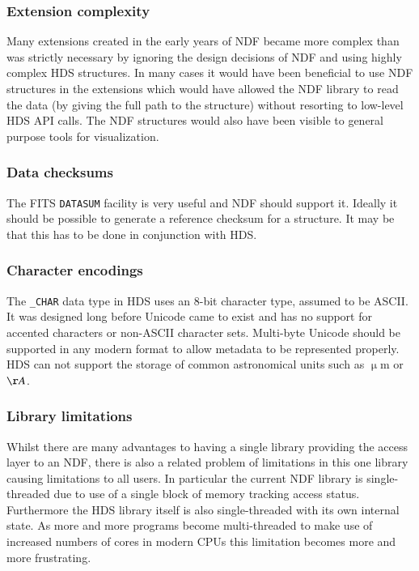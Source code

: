 \documentclass[final,authoryear,5p,times,twocolumn]{elsarticle}
\begin{document}
\subsubsection{Extension complexity}

Many extensions created in the early years of NDF became more complex
than was strictly necessary by ignoring the design decisions of NDF and
using highly complex HDS structures. In many cases it would have been
beneficial to use NDF structures in the extensions which would have
allowed the NDF library to read the data (by giving the full path to
the structure) without resorting to low-level HDS API calls. The NDF
structures would also have been visible to general purpose tools for
visualization.

\subsubsection{Data checksums}

The FITS \texttt{DATASUM} facility is very useful and NDF should support
it. Ideally it should be possible to generate a reference checksum for
a structure. It may be that this has to be done in conjunction with
HDS.

\subsubsection{Character encodings}

The \texttt{\_CHAR} data type in HDS uses an 8-bit character type,
assumed to be ASCII. It was designed long before Unicode came to exist
and has no support for accented characters or non-ASCII character
sets. Multi-byte Unicode should be supported in any modern format to
allow metadata to be represented properly. HDS can not support the
storage of common astronomical units such as $\upmu$m or $\AA$.

\subsubsection{Library limitations}

Whilst there are many advantages to having a single library
providing the access layer to an NDF, there is also a related problem
of limitations in this one library causing limitations to all
users. In particular the current NDF library is single-threaded due to
use of a single block of memory tracking access status. Furthermore
the HDS library itself is also single-threaded with its own internal
state. As more and more programs become multi-threaded to make use of
increased numbers of cores in modern CPUs this limitation becomes more
and more frustrating.
\end{document}

